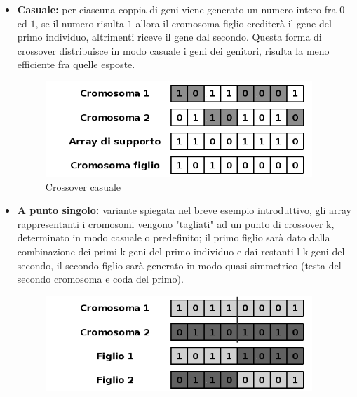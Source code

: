 \begin{itemize}
    \item\textbf{Casuale:} per ciascuna coppia di geni viene generato un numero intero fra $0$ ed $1$, se il numero risulta $1$ allora il cromosoma figlio erediter\`a il gene del primo individuo, altrimenti riceve il gene dal secondo. Questa forma di crossover distribuisce in modo casuale i geni dei genitori, risulta la meno efficiente fra quelle esposte.
    \begin{figure}[H]
        \centering
        \hfill
        \includegraphics[width=0.95\textwidth]{Images/CrossoverRandom.png}
        \hspace*{\fill}
        \caption{Crossover casuale}
        \label{fig:randomcrossover}
    \end{figure}
    \item \textbf{A punto singolo:} variante spiegata nel breve esempio introduttivo, gli array rappresentanti i cromosomi vengono "tagliati" ad un punto di crossover k, determinato in modo casuale o predefinito; il primo figlio sar\`a dato dalla combinazione dei primi k geni del primo individuo e dai restanti l-k geni del secondo, il secondo figlio sar\`a generato in modo quasi simmetrico (testa del secondo cromosoma e coda del primo).
    \begin{figure}[H]
        \centering
        \hfill
        \includegraphics[width=0.95\textwidth]{Images/CrossoverSinglePoint.png}
        \hspace*{\fill}

\end{figure}
\end{itemize}
